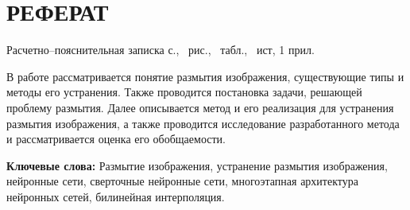 \part*{РЕФЕРАТ}

Расчетно--пояснительная записка \pageref{LastPage} с., \totalfigures\ рис., \totaltables\ табл., \thetotalbibentries\ ист, 1 прил.

В работе рассматривается понятие размытия изображения, существующие типы и методы его устранения. Также проводится постановка задачи, решающей проблему размытия. Далее описывается метод и его реализация для устранения размытия изображения, а также проводится исследование разработанного метода и рассматривается оценка его обобщаемости.

\textbf{Ключевые слова:} Размытие изображения, устранение размытия изображения, нейронные сети, сверточные нейронные сети, многоэтапная архитектура нейронных сетей, билинейная интерполяция.